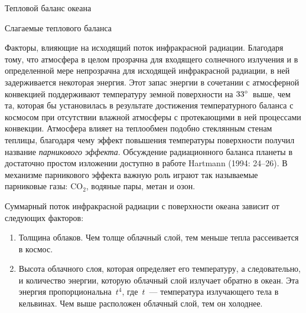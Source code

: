 \begin{chapter}{Тепловой баланс океана}
\begin{section}{Слагаемые теплового баланса}
\begin{paragraph}{Факторы, влияющие на исходящий поток инфракрасной радиации.}
Благодаря тому, что атмосфера в целом прозрачна для входящего солнечного
излучения и в определенной мере непрозрачна для исходящей инфракрасной
радиации, в ней задерживается некоторая энергия. Этот запас энергии в 
сочетании с атмосферной конвекцией поддерживают температуру земной 
поверхности на ${33}^\circ$~выше, чем та, которая бы установилась 
в результате достижения температурного баланса с космосом при отсутствии 
влажной атмосферы с протекающими в ней процессами конвекции. 
Атмосфера влияет на теплообмен подобно стеклянным стенам теплицы, благодаря 
чему эффект повышения температуры поверхности получил название 
\emph{парникового эффекта}. Обсуждение радиационного баланса планеты в 
достаточно простом изложении доступно в работе Hartmann (1994: 24--26).
В механизме парникового эффекта важную роль играют так называемые 
парниковые газы: $\text{CO}_2$, водяные пары, метан и озон.
%

Суммарный поток инфракрасной радиации с поверхности океана зависит от 
следующих факторов:
%
\begin{enumerate}
\item
Толщина облаков. Чем толще облачный слой, тем меньше тепла рассеивается 
в космос.
%

\item
Высота облачного слоя, которая определяет его температуру, а следовательно,
и количество энергии, которую облачный слой излучает обратно в океан. Эта
энергия пропорциональна~$t^4$, где~$t$~--- температура излучающего тела
в кельвинах. Чем выше расположен облачный слой, тем он холоднее.
%


\end{enumerate}
\end{paragraph}
\end{section}
\end{chapter}
